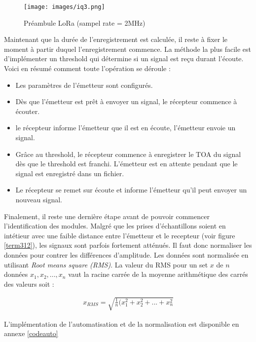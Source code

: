 \clearpage

\begin{figure}[h]
\centering

\texttt{[image: images/iq3.png]}
\caption{Préambule LoRa (sampel rate = 2MHz)}\label{term311}
\end{figure}

Maintenant que la durée de l'enregistrement est calculée, il reste à fixer le moment à partir duquel l'enregistrement commence. La méthode la plus facile est d'implémenter un threshold qui détermine si un signal est reçu durant l'écoute. Voici en résumé comment toute l'opération se déroule :

\begin{itemize}
\item Les paramètres de l'émetteur sont configurés. 
\item Dès que l'émetteur est prêt à envoyer un signal, le récepteur commence à écouter.
\item le récepteur informe l'émetteur que il est en écoute, l'émetteur envoie un signal.
\item Grâce au threshold, le récepteur commence à enregistrer le TOA du signal dès que le threshold est franchi. L'émetteur est en attente pendant que le signal est enregistré dans un fichier.
\item Le récepteur se remet sur écoute et informe l'émetteur qu'il peut envoyer un nouveau signal.
\end{itemize}

Finalement, il reste une dernière étape avant de pouvoir commencer l'identification des modules. Malgré que les prises d'échantillons soient en intétieur avec une faible distance entre l'émetteur et le recepteur (voir figure \ref{term312}), les signaux sont parfois fortement atténués. Il faut donc normaliser les données pour contrer les différences d'amplitude. Les données sont normalisée en utilisant \textit{Root means square (RMS)}. La valeur du RMS pour un set $x$ de $n$ données ${x_1,x_2,...,x_n}$ vaut la racine carrée de la moyenne arithmétique des carrés des valeurs soit :

\begin{align}
    x_{RMS} = \sqrt{\frac{1}{n}(x_1^2 + x_2^2 + ... + x_n^2}
\end{align}

L'implémentation de l'automatisation et de la normalisation est disponible en annexe \ref{codeauto}

